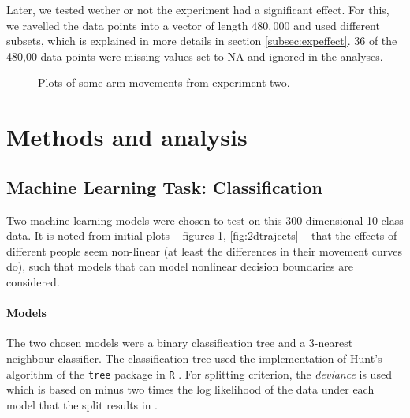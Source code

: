 \documentclass[11pt,fleqn]{article}
\begin{document}
Later, we tested wether or not the experiment had a significant effect.
For this, we ravelled the data points into a vector of length $ 480,000 $ and used different subsets, which is explained in more details in section \ref{subsec:expeffect}. 36 of the 480,00 data points were missing values set to NA and ignored in the analyses.

\begin{figure}[H]
	\centering
	\hfill
	\caption{Plots of some arm movements from experiment two.}\label{fig:trajects}
\end{figure}

\section{Methods and analysis}


\subsection{Machine Learning Task: Classification}
Two machine learning models were chosen to test on this 300-dimensional 10-class data.
It is noted from initial plots -- figures \ref{fig:trajects}, \ref{fig:2dtrajects} -- that the effects of different people seem non-linear (at least the differences in their movement curves do), such that models that can model nonlinear decision boundaries are considered.
\paragraph{Models} The two chosen models were a binary classification tree and a 3-nearest neighbour classifier. The classification tree used the implementation of Hunt's algorithm of the \texttt{tree} package in \texttt{R} \cite{Tree}. For splitting criterion, the \textit{deviance} is used which is based on minus two times the log likelihood of the data under each model that the split results in \cite{Deviance}.
\end{document}
